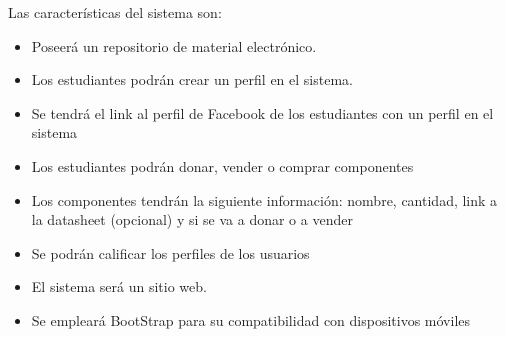 Las características del sistema son:

\begin{itemize}
	\item  Poseerá un repositorio de material electrónico.
	\item Los estudiantes podrán crear un perfil en el sistema.
	\item  Se tendrá el link al perfil de Facebook de los estudiantes con un perfil en el sistema
	\item Los estudiantes podrán donar, vender o comprar componentes
	\item  Los componentes tendrán la siguiente información: nombre, cantidad, link a la datasheet (opcional) y si se va a donar o a vender
	\item  Se podrán calificar los perfiles de los usuarios
	\item  El sistema será un sitio web.
	\item Se empleará BootStrap para su compatibilidad con dispositivos móviles
\end{itemize}
